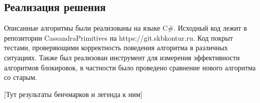 \subsection{Реализация решения}

Описанные алгоритмы были реализованы на языке C\#. Исходный код лежит в репозитории CassandraPrimitives на https://git.skbkontur.ru. Код покрыт тестами, проверяющими корректность поведения алгоритма в различных ситуациях. Также был реализован инструмент для измерения эффективности алгоритмов блокировок, в частности было проведено сравнение нового алгоритма со старым.

[Тут результаты бенчмарков и легенда к ним]